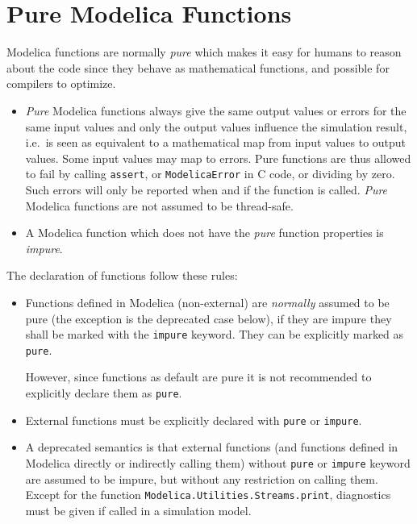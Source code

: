 \section{Pure Modelica Functions}\label{pure-modelica-functions}

Modelica functions are normally \emph{pure} which makes it easy for
humans to reason about the code since they behave as mathematical
functions, and possible for compilers to optimize.

\begin{itemize}
\item
  \emph{Pure} Modelica functions always give the same output values or
  errors for the same input values and only the output values influence
  the simulation result, i.e.\ is seen as equivalent to a mathematical
  map from input values to output values. Some input values may map to
  errors. Pure functions are thus allowed to fail by calling \lstinline!assert!, or
  \lstinline[language=C]!ModelicaError! in C code, or dividing by zero. Such errors will only be
  reported when and if the function is called.  \emph{Pure} Modelica
  functions are not assumed to be thread-safe.
\item
  A Modelica function which does not have the \emph{pure} function
  properties is \emph{impure}.
\end{itemize}

The declaration of functions follow these rules:
\begin{itemize}
\item
  Functions defined in Modelica (non-external) are \emph{normally} assumed to be pure (the exception is the deprecated case below), if they are impure they shall be marked with the \lstinline!impure! keyword.  They can be explicitly marked as \lstinline!pure!.
  \begin{nonnormative}
  However, since functions as default are pure it is not recommended to explicitly declare them as \lstinline!pure!.
  \end{nonnormative}
\item
  External functions must be explicitly declared with \lstinline!pure! or \lstinline!impure!.
\item
  A deprecated semantics is that external functions (and functions defined in Modelica directly or indirectly calling them) without \lstinline!pure! or \lstinline!impure! keyword are assumed to be
  impure, but without any restriction on calling them.  Except for the function \lstinline!Modelica.Utilities.Streams.print!, diagnostics must be given if called in a simulation model.
\end{itemize}

